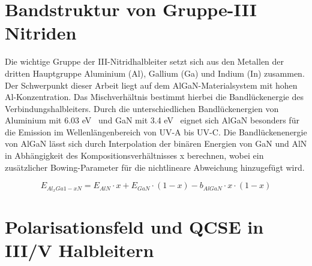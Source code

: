 

\thispagestyle{fancy}

\section{Bandstruktur von Gruppe-III Nitriden}

Die wichtige Gruppe der III-Nitridhalbleiter setzt sich aus den Metallen
der dritten Hauptgruppe Aluminium (Al), Gallium (Ga) und Indium (In) zusammen.
Der Schwerpunkt dieser Arbeit liegt auf dem AlGaN-Materialsystem mit hohen Al-Konzentration. Das Mischverhältnis bestimmt hierbei die Bandlückenergie des Verbindungshalbleiters. Durch die unterschiedlichen Bandlückenergien von Aluminium mit 6.03 eV~\cite{fenaln} und GaN mit 3.4 eV~\cite{pipr} eignet sich AlGaN besonders für die Emission im Wellenlängenbereich von UV-A bis UV-C. 
Die Bandlückenenergie von AlGaN lässt sich durch Interpolation der binären Energien von GaN und AlN in Abhängigkeit des Kompositionsverhältnisses x berechnen, wobei ein zusätzlicher Bowing-Parameter für die nichtlineare Abweichung hinzugefügt wird. 

\begin{equation}
    E_{Al_{x}Ga{1-x}N} = E_{AlN} \cdot x + E_{GaN} \cdot (1-x) - b_{AlGaN} \cdot x \cdot (1-x) 
\end{equation}


\newpage
\section{Polarisationsfeld und QCSE in III/V Halbleitern}

